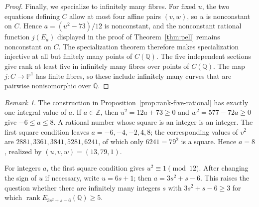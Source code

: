 \documentclass[11pt,leqno,oneside,letterpaper]{amsart}
\theoremstyle{remark}
\newtheorem{remark}[theorem]{Remark}
\numberwithin{equation}{section}
\newcommand{\Q}{\mathbb Q}
\newcommand{\Z}{\mathbb Z}
\DeclareMathOperator{\rank}{rank}
\begin{document}
\begin{proof}
  Finally, we specialize to infinitely many fibres. For fixed $u$, the two equations defining $C$ allow at most four affine pairs $(v,w)$, so $u$ is nonconstant on $C$. Hence $a=(u^2-73)/12$ is nonconstant, and the nonconstant rational function $j(E_a)$ displayed in the proof of Theorem~\ref{thm:pell} remains nonconstant on $C$. The specialization theorem \cite[Theorem C.20.3]{Silverman2009} therefore makes specialization injective at all but finitely many points of $C(\Q)$. The five independent sections give rank at least five in infinitely many fibres over points of $C(\Q)$. The map $j:C\to\mathbb P^1$ has finite fibres, so these include infinitely many curves that are pairwise nonisomorphic over $\overline{\Q}$.
\end{proof}

\begin{remark}\label{rem:rank-five-integrality}
  The construction in Proposition~\ref{prop:rank-five-rational} has exactly one integral value of $a$. If $a\in\Z$, then $u^2=12a+73\geq0$ and $w^2=577-72a\geq0$ give $-6\leq a\leq8$. A rational number whose square is an integer is an integer. The first square condition leaves $a=-6,-4,-2,4,8$; the corresponding values of $v^2$ are $2881,3361,3841,5281,6241$, of which only $6241=79^2$ is a square. Hence $a=8$, realized by $(u,v,w)=(13,79,1)$.
\end{remark}

For integers $a$, the first square condition gives $u^2\equiv1\pmod{12}$. After changing the sign of $u$ if necessary, write $u=6s+1$; then $a=3s^2+s-6$. This raises the question whether there are infinitely many integers $s$ with $3s^2+s-6\geq3$ for which $\rank E_{3s^2+s-6}(\Q)\geq5$.






\begingroup
\raggedright

\endgroup
\end{document}
